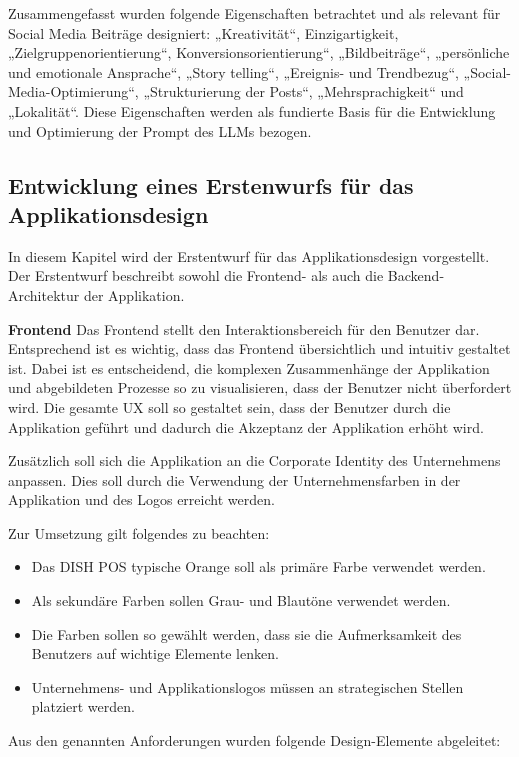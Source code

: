 Zusammengefasst wurden folgende Eigenschaften betrachtet und als relevant für Social Media Beiträge designiert: „Kreativität“, Einzigartigkeit, „Zielgruppenorientierung“, Konversionsorientierung“, „Bildbeiträge“, „persönliche und emotionale Ansprache“, „Story telling“, „Ereignis- und Trendbezug“, „Social-Media-Optimierung“, „Strukturierung der Posts“, „Mehrsprachigkeit“ und „Lokalität“.
Diese Eigenschaften werden als fundierte Basis für die Entwicklung und Optimierung der Prompt des LLMs bezogen.

\subsection{Entwicklung eines Erstenwurfs für das Applikationsdesign}\label{subsec:entwicklung-eines-erstenwurfs-fuer-das-applikationsdesign}
In diesem Kapitel wird der Erstentwurf für das Applikationsdesign vorgestellt.
Der Erstentwurf beschreibt sowohl die Frontend- als auch die Backend-Architektur der Applikation.

\textbf{Frontend}\newline
Das Frontend stellt den Interaktionsbereich für den Benutzer dar.
Entsprechend ist es wichtig, dass das Frontend übersichtlich und intuitiv gestaltet ist.
Dabei ist es entscheidend, die komplexen Zusammenhänge der Applikation und abgebildeten Prozesse so zu visualisieren, dass der Benutzer nicht überfordert wird.
Die gesamte \ac{UX} soll so gestaltet sein, dass der Benutzer durch die Applikation geführt und dadurch die Akzeptanz der Applikation erhöht wird.

Zusätzlich soll sich die Applikation an die Corporate Identity des Unternehmens anpassen.
Dies soll durch die Verwendung der Unternehmensfarben in der Applikation und des Logos erreicht werden.

Zur Umsetzung gilt folgendes zu beachten:
\begin{itemize}
    \item Das DISH POS typische Orange soll als primäre Farbe verwendet werden.
    \item Als sekundäre Farben sollen Grau- und Blautöne verwendet werden.
    \item Die Farben sollen so gewählt werden, dass sie die Aufmerksamkeit des Benutzers auf wichtige Elemente lenken.
    \item Unternehmens- und Applikationslogos müssen an strategischen Stellen platziert werden.
\end{itemize}
\newpage

Aus den genannten Anforderungen wurden folgende Design-Elemente abgeleitet:

